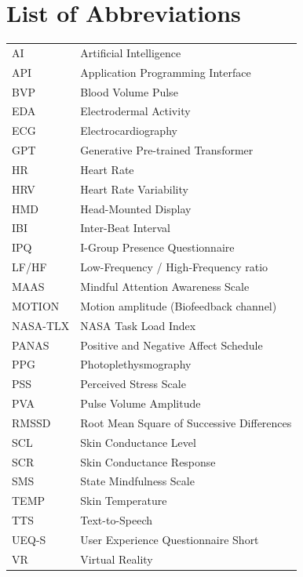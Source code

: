 \chapter*{List of Abbreviations}
\thispagestyle{plain}

\begin{longtable}{p{3.5cm} p{11cm}}
AI   & Artificial Intelligence \\
API  & Application Programming Interface \\
BVP  & Blood Volume Pulse \\
EDA  & Electrodermal Activity \\
ECG  & Electrocardiography \\
GPT  & Generative Pre-trained Transformer \\
HR   & Heart Rate \\
HRV  & Heart Rate Variability \\
HMD  & Head-Mounted Display \\
IBI  & Inter-Beat Interval \\
IPQ  & I-Group Presence Questionnaire \\
LF/HF & Low-Frequency / High-Frequency ratio \\
MAAS & Mindful Attention Awareness Scale \\
MOTION & Motion amplitude (Biofeedback channel) \\
NASA-TLX & NASA Task Load Index \\
PANAS & Positive and Negative Affect Schedule \\
PPG  & Photoplethysmography \\
PSS  & Perceived Stress Scale \\
PVA  & Pulse Volume Amplitude \\
RMSSD & Root Mean Square of Successive Differences \\
SCL  & Skin Conductance Level \\
SCR  & Skin Conductance Response \\
SMS  & State Mindfulness Scale \\
TEMP & Skin Temperature \\
TTS  & Text-to-Speech \\
UEQ-S & User Experience Questionnaire Short \\
VR   & Virtual Reality \\
\end{longtable}
